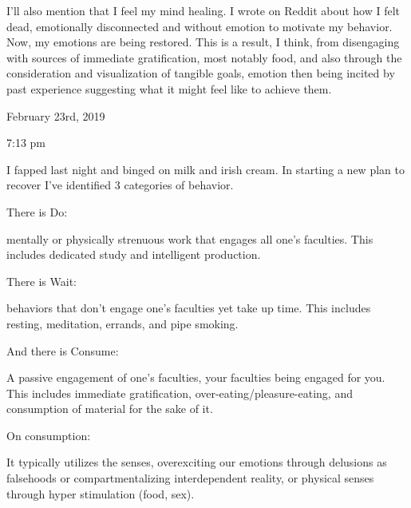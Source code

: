 I'll also mention that I feel my mind healing. I wrote on Reddit about
how I felt dead, emotionally disconnected and without emotion to
motivate my behavior. Now, my emotions are being restored. This is a
result, I think, from disengaging with sources of immediate
gratification, most notably food, and also through the consideration and
visualization of tangible goals, emotion then being incited by past
experience suggesting what it might feel like to achieve them.

\bigskip
\bigskip
February 23rd, 2019

7:13 pm

I fapped last night and binged on milk and irish cream. In starting a
new plan to recover I've identified 3 categories of behavior.

There is Do:

mentally or physically strenuous work that engages all one's faculties.
This includes dedicated study and intelligent production.

There is Wait:

behaviors that don't engage one's faculties yet take up time. This
includes resting, meditation, errands, and pipe smoking.

And there is Consume:

A passive engagement of one's faculties, your faculties being engaged
for you. This includes immediate gratification,
over-eating/pleasure-eating, and consumption of material for the sake of
it.

On consumption:

It typically utilizes the senses, overexciting our emotions through
delusions as falsehoods or compartmentalizing interdependent reality, or
physical senses through hyper stimulation (food, sex).

